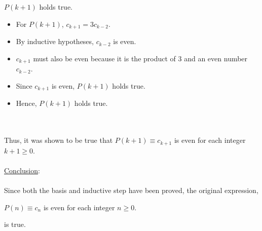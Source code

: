 \documentclass[12pt]{article}
\newcommand{\xlist}[1]{
    \begin{itemize}
        \renewcommand{\labelitemi}{$\centerdot$}
        #1
    \end{itemize}
    \newblock
    \\ \\
}
\newcommand{\xconclusion}[1]{
    \underline{Conclusion}:
    \\ \\
    #1
    \\ \\
}
\begin{document}
\newblock
\\ \\
$P(k+1)$ holds true.
\xlist{
    \item For $P(k+1)$, $c_{k+1} = 3c_{k-2}$.
    \item By inductive hypotheses, $c_{k-2}$ is even.
    \item $c_{k+1}$ must also be even because it is the product of 3 and an even number $c_{k-2}$.
    \item Since $c_{k+1}$ is even, $P(k+1)$ holds true.
    \item Hence, $P(k+1)$ holds true.
}
Thus, it was shown to be true that $P(k+1) \equiv c_{k+1}$ is even for each integer $k + 1 \geq 0$.
\\ \\
\xconclusion{
    Since both the basis and inductive step have been proved, the original expression,
    \begin{center}
        $P(n) \equiv c_n$ is even for each integer $n \geq 0$.
    \end{center}
    is true.
}
\end{document}
